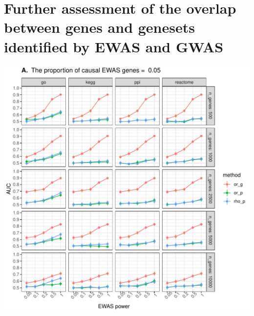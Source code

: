 \documentclass[11pt,twoside]{bristolthesis}
\begin{document}
\appendix

\hypertarget{further-assessment-of-the-overlap-between-genes-and-genesets-identified-by-ewas-and-gwas}{%
\chapter{Further assessment of the overlap between genes and genesets identified by EWAS and GWAS}\label{further-assessment-of-the-overlap-between-genes-and-genesets-identified-by-ewas-and-gwas}}

\pagebreak




\begin{center}\includegraphics[width=1\linewidth]{figure/06-ewas_gwas_comparison/method_test_gene_up_all/PEC_0.05} \end{center}
\end{document}
